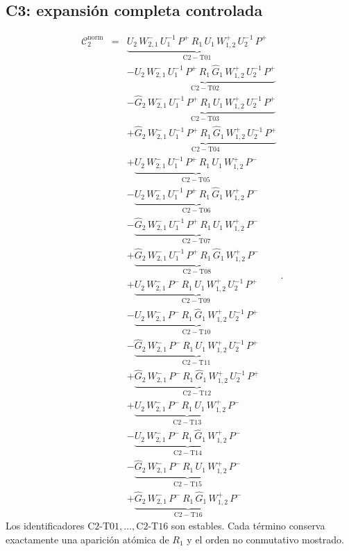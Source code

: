 \subsection*{C3: expansión completa controlada}
\[
\begin{aligned}\mathcal C_{2}^{\mathrm{norm}} &={}& \underbrace{U_{2}\,W^-_{2,1}\,U_{1}^{-1}\,P^{+}\,R_{1}\,U_{1}\,W^+_{1,2}\,U_{2}^{-1}\,P^{+}}_{\mathrm{C2-T01}} \\ &&- \underbrace{U_{2}\,W^-_{2,1}\,U_{1}^{-1}\,P^{+}\,R_{1}\,\widehat G_{1}\,W^+_{1,2}\,U_{2}^{-1}\,P^{+}}_{\mathrm{C2-T02}} \\ &&- \underbrace{\widehat G_{2}\,W^-_{2,1}\,U_{1}^{-1}\,P^{+}\,R_{1}\,U_{1}\,W^+_{1,2}\,U_{2}^{-1}\,P^{+}}_{\mathrm{C2-T03}} \\ &&+ \underbrace{\widehat G_{2}\,W^-_{2,1}\,U_{1}^{-1}\,P^{+}\,R_{1}\,\widehat G_{1}\,W^+_{1,2}\,U_{2}^{-1}\,P^{+}}_{\mathrm{C2-T04}} \\ &&+ \underbrace{U_{2}\,W^-_{2,1}\,U_{1}^{-1}\,P^{+}\,R_{1}\,U_{1}\,W^+_{1,2}\,P^{-}}_{\mathrm{C2-T05}} \\ &&- \underbrace{U_{2}\,W^-_{2,1}\,U_{1}^{-1}\,P^{+}\,R_{1}\,\widehat G_{1}\,W^+_{1,2}\,P^{-}}_{\mathrm{C2-T06}} \\ &&- \underbrace{\widehat G_{2}\,W^-_{2,1}\,U_{1}^{-1}\,P^{+}\,R_{1}\,U_{1}\,W^+_{1,2}\,P^{-}}_{\mathrm{C2-T07}} \\ &&+ \underbrace{\widehat G_{2}\,W^-_{2,1}\,U_{1}^{-1}\,P^{+}\,R_{1}\,\widehat G_{1}\,W^+_{1,2}\,P^{-}}_{\mathrm{C2-T08}} \\ &&+ \underbrace{U_{2}\,W^-_{2,1}\,P^{-}\,R_{1}\,U_{1}\,W^+_{1,2}\,U_{2}^{-1}\,P^{+}}_{\mathrm{C2-T09}} \\ &&- \underbrace{U_{2}\,W^-_{2,1}\,P^{-}\,R_{1}\,\widehat G_{1}\,W^+_{1,2}\,U_{2}^{-1}\,P^{+}}_{\mathrm{C2-T10}} \\ &&- \underbrace{\widehat G_{2}\,W^-_{2,1}\,P^{-}\,R_{1}\,U_{1}\,W^+_{1,2}\,U_{2}^{-1}\,P^{+}}_{\mathrm{C2-T11}} \\ &&+ \underbrace{\widehat G_{2}\,W^-_{2,1}\,P^{-}\,R_{1}\,\widehat G_{1}\,W^+_{1,2}\,U_{2}^{-1}\,P^{+}}_{\mathrm{C2-T12}} \\ &&+ \underbrace{U_{2}\,W^-_{2,1}\,P^{-}\,R_{1}\,U_{1}\,W^+_{1,2}\,P^{-}}_{\mathrm{C2-T13}} \\ &&- \underbrace{U_{2}\,W^-_{2,1}\,P^{-}\,R_{1}\,\widehat G_{1}\,W^+_{1,2}\,P^{-}}_{\mathrm{C2-T14}} \\ &&- \underbrace{\widehat G_{2}\,W^-_{2,1}\,P^{-}\,R_{1}\,U_{1}\,W^+_{1,2}\,P^{-}}_{\mathrm{C2-T15}} \\ &&+ \underbrace{\widehat G_{2}\,W^-_{2,1}\,P^{-}\,R_{1}\,\widehat G_{1}\,W^+_{1,2}\,P^{-}}_{\mathrm{C2-T16}}\end{aligned}.
\]
Los identificadores $\mathrm{C2\text{-}T01},\ldots,
\mathrm{C2\text{-}T16}$ son estables. Cada término conserva exactamente una
aparición atómica de $R_1$ y el orden no conmutativo mostrado.


